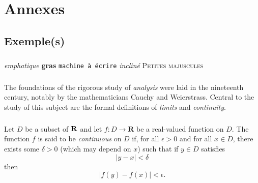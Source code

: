%
\appendix{}
%
\chapter{Annexes}
%
    \section{Exemple(s)}
%
        \paragraph{}
\emph{emphatique}
\textbf{gras}
\texttt{machine à écrire}
\textsl{incliné}
\textsc{Petites majuscules}
%
        \paragraph{}
The foundations of the rigorous study of \emph{analysis}
were laid in the nineteenth century, notably by the
mathematicians Cauchy and Weierstrass. Central to the
study of this subject are the formal definitions of
\emph{limits} and \emph{continuity}.
%
        \paragraph{}
Let $D$ be a subset of $\bf R$ and let
$f \colon D \to \mathbf{R}$ be a real-valued function on
$D$. The function $f$ is said to be \emph{continuous} on
$D$ if, for all $\epsilon > 0$ and for all $x \in D$,
there exists some $\delta > 0$ (which may depend on $x$)
such that if $y \in D$ satisfies
\[ |y - x| < \delta \]
then
\[ |f(y) - f(x)| < \epsilon. \]
%

